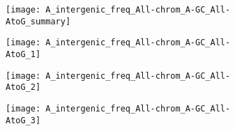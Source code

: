 \documentclass[letter]{article}
\begin{document}
\begin{figure}
\centering
    \begin{subfigure}[b]{0.415\textwidth}
        \centering
        \texttt{[image: A\_intergenic\_freq\_All-chrom\_A-GC\_All-AtoG\_summary]}
        \caption{}
        \label{fig:a-g:summary}
    \end{subfigure}
    \hspace{1em}
    \begin{subfigure}[b]{0.4\textwidth}
        \centering
        \texttt{[image: A\_intergenic\_freq\_All-chrom\_A-GC\_All-AtoG\_1]}
        \caption{}
        \label{fig:a-g:1}
    \end{subfigure}
    
    \begin{subfigure}[b]{0.4\textwidth}
        \centering
        \texttt{[image: A\_intergenic\_freq\_All-chrom\_A-GC\_All-AtoG\_2]}
        \caption{}
        \label{fig:a-g:2}
    \end{subfigure}
    \hspace{1em}
    \begin{subfigure}[b]{0.4\textwidth}
        \centering
         \texttt{[image: A\_intergenic\_freq\_All-chrom\_A-GC\_All-AtoG\_3]}
        \caption{}
        \label{fig:a-g:3}
    \end{subfigure}
\end{figure}
\end{document}

